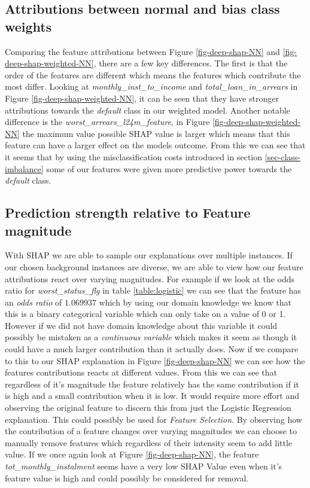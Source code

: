 \subsection{Attributions between normal and bias class weights}
Comparing the feature attributions between Figure \ref{fig-deep-shap-NN} and \ref{fig-deep-shap-weighted-NN}, there are a few key differences. The first is that the order of the features are different which means the features which contribute the most differ. Looking at \emph{monthly\_inst\_to\_income} and \emph{total\_loan\_in\_arrears} in Figure  \ref{fig-deep-shap-weighted-NN}, it can be seen that they have stronger attributions towards the \emph{default} class in our weighted model. Another notable difference is the \emph{worst\_arrears\_l24m\_feature}, in Figure \ref{fig-deep-shap-weighted-NN} the maximum value possible SHAP value is larger which means that this feature can have a larger effect on the models outcome. From this we can see that it seems that by using the misclassification costs introduced in section \ref{sec-class-imbalance} some of our features were given more predictive power towards the \emph{default} class.

\subsection{Prediction strength relative to Feature magnitude} \label{sect-prediction-strength}
With SHAP we are able to sample our explanations over multiple instances. If our chosen background instances are diverse, we are able to view how our feature attributions react over varying magnitudes. For example if we look at the odds ratio for \emph{worst\_status\_flg} in table \ref{table:logistic} we can see that the feature has an \emph{odds ratio} of $1.069937$ which by using our domain knowledge we know that this is a binary categorical variable which can only take on a value of 0 or 1. However if we did not have domain knowledge about this variable it could possibly be mistaken as a \emph{continuous variable} which makes it seem as though it could have a much larger contribution than it actually does. Now if we compare to this to our SHAP explanation in Figure \ref{fig-deep-shap-NN} we can see how the features contributions reacts at different values. From this we can see that regardless of it's magnitude the feature relatively has the same contribution if it is high and a small contribution when it is low. It would require more effort and observing the original feature to discern this from just the Logistic Regression explanation. This could possibly be used for \emph{Feature Selection}. By observing how the contribution of a feature changes over varying magnitudes we can choose to manually remove features which regardless of their intensity seem to add little value. If we once again look at Figure \ref{fig-deep-shap-NN}, the feature \emph{tot\_monthly\_instalment} seems have a very low SHAP Value even when it's feature value is high and could possibly be considered for removal. 